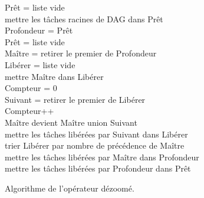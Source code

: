 \begin{algorithm}
  {\sc Prêt} = liste vide \\
  mettre les tâches racines de DAG dans {\sc Prêt} \\
   {
    {\sc Profondeur} = {\sc Prêt} \\
    {\sc Prêt} = liste vide \\
     {
      {\sc Maître} = retirer le premier de {\sc Profondeur} \\
      {\sc Libérer} = liste vide \\
      mettre {\sc Maître} dans {\sc Libérer} \\
      {\sc Compteur} = 0 \\
       {
        {\sc Suivant} = retirer le premier de {\sc Libérer} \\
        {\sc Compteur}++\\
        {\sc Maître} devient {\sc Maître} union {\sc Suivant}\\
        mettre les tâches libérées par {\sc Suivant} dans {\sc Libérer} \\
        trier {\sc Libérer} par nombre de précédence de {\sc Maître} \\
      }
      mettre les tâches libérées par {\sc Maître} dans {\sc Profondeur} \\
    }
    mettre les tâches libérées par {\sc Profondeur} dans {\sc Prêt}\\
  }
  \caption{Algorithme de l'opérateur dézoomé.}
  \label{algo:algo_D}
\end{algorithm}
